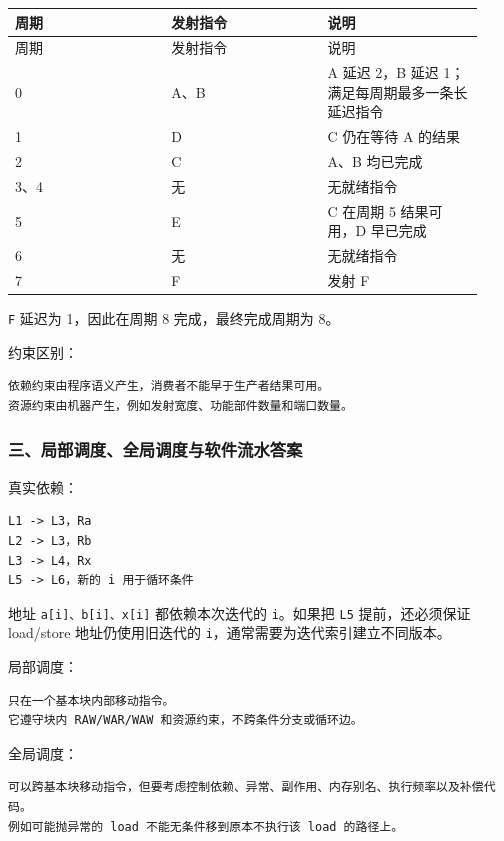 \documentclass[UTF8]{ctexart}
\begin{document}
\begin{longtable}{|p{0.31\linewidth}|p{0.31\linewidth}|p{0.31\linewidth}|}
\hline
周期 & 发射指令 & 说明 \\
\hline
\endfirsthead
周期 & 发射指令 & 说明 \\
\hline
\endhead
0 & A、B & A 延迟 2，B 延迟 1；满足每周期最多一条长延迟指令 \\
\hline
1 & D & C 仍在等待 A 的结果 \\
\hline
2 & C & A、B 均已完成 \\
\hline
3、4 & 无 & 无就绪指令 \\
\hline
5 & E & C 在周期 5 结果可用，D 早已完成 \\
\hline
6 & 无 & 无就绪指令 \\
\hline
7 & F & 发射 F \\
\hline
\end{longtable}


\texttt{F} 延迟为 1，因此在周期 8 完成，最终完成周期为 8。

约束区别：

\begin{Verbatim}[fontsize=\small,breaklines=true]
依赖约束由程序语义产生，消费者不能早于生产者结果可用。
资源约束由机器产生，例如发射宽度、功能部件数量和端口数量。
\end{Verbatim}

\subsubsection*{三、局部调度、全局调度与软件流水答案}

真实依赖：

\begin{Verbatim}[fontsize=\small,breaklines=true]
L1 -> L3，Ra
L2 -> L3，Rb
L3 -> L4，Rx
L5 -> L6，新的 i 用于循环条件
\end{Verbatim}

地址 \texttt{a[i]、b[i]、x[i]} 都依赖本次迭代的 \texttt{i}。如果把 \texttt{L5} 提前，还必须保证 load/store 地址仍使用旧迭代的 \texttt{i}，通常需要为迭代索引建立不同版本。

局部调度：

\begin{Verbatim}[fontsize=\small,breaklines=true]
只在一个基本块内部移动指令。
它遵守块内 RAW/WAR/WAW 和资源约束，不跨条件分支或循环边。
\end{Verbatim}

全局调度：

\begin{Verbatim}[fontsize=\small,breaklines=true]
可以跨基本块移动指令，但要考虑控制依赖、异常、副作用、内存别名、执行频率以及补偿代码。
例如可能抛异常的 load 不能无条件移到原本不执行该 load 的路径上。
\end{Verbatim}
\end{document}
